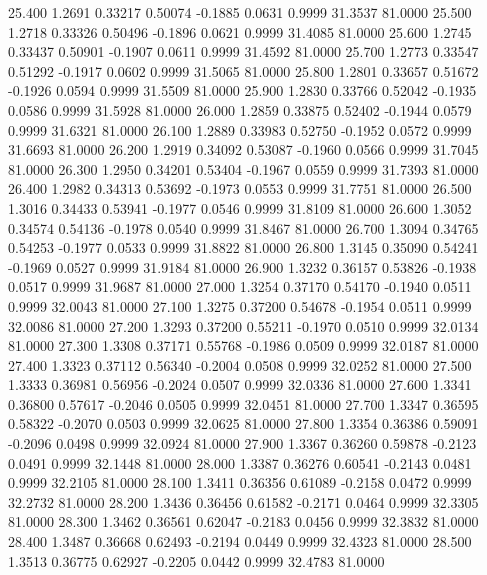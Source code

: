   25.400   1.2691   0.33217   0.50074  -0.1885   0.0631   0.9999  31.3537  81.0000
  25.500   1.2718   0.33326   0.50496  -0.1896   0.0621   0.9999  31.4085  81.0000
  25.600   1.2745   0.33437   0.50901  -0.1907   0.0611   0.9999  31.4592  81.0000
  25.700   1.2773   0.33547   0.51292  -0.1917   0.0602   0.9999  31.5065  81.0000
  25.800   1.2801   0.33657   0.51672  -0.1926   0.0594   0.9999  31.5509  81.0000
  25.900   1.2830   0.33766   0.52042  -0.1935   0.0586   0.9999  31.5928  81.0000
  26.000   1.2859   0.33875   0.52402  -0.1944   0.0579   0.9999  31.6321  81.0000
  26.100   1.2889   0.33983   0.52750  -0.1952   0.0572   0.9999  31.6693  81.0000
  26.200   1.2919   0.34092   0.53087  -0.1960   0.0566   0.9999  31.7045  81.0000
  26.300   1.2950   0.34201   0.53404  -0.1967   0.0559   0.9999  31.7393  81.0000
  26.400   1.2982   0.34313   0.53692  -0.1973   0.0553   0.9999  31.7751  81.0000
  26.500   1.3016   0.34433   0.53941  -0.1977   0.0546   0.9999  31.8109  81.0000
  26.600   1.3052   0.34574   0.54136  -0.1978   0.0540   0.9999  31.8467  81.0000
  26.700   1.3094   0.34765   0.54253  -0.1977   0.0533   0.9999  31.8822  81.0000
  26.800   1.3145   0.35090   0.54241  -0.1969   0.0527   0.9999  31.9184  81.0000
  26.900   1.3232   0.36157   0.53826  -0.1938   0.0517   0.9999  31.9687  81.0000
  27.000   1.3254   0.37170   0.54170  -0.1940   0.0511   0.9999  32.0043  81.0000
  27.100   1.3275   0.37200   0.54678  -0.1954   0.0511   0.9999  32.0086  81.0000
  27.200   1.3293   0.37200   0.55211  -0.1970   0.0510   0.9999  32.0134  81.0000
  27.300   1.3308   0.37171   0.55768  -0.1986   0.0509   0.9999  32.0187  81.0000
  27.400   1.3323   0.37112   0.56340  -0.2004   0.0508   0.9999  32.0252  81.0000
  27.500   1.3333   0.36981   0.56956  -0.2024   0.0507   0.9999  32.0336  81.0000
  27.600   1.3341   0.36800   0.57617  -0.2046   0.0505   0.9999  32.0451  81.0000
  27.700   1.3347   0.36595   0.58322  -0.2070   0.0503   0.9999  32.0625  81.0000
  27.800   1.3354   0.36386   0.59091  -0.2096   0.0498   0.9999  32.0924  81.0000
  27.900   1.3367   0.36260   0.59878  -0.2123   0.0491   0.9999  32.1448  81.0000
  28.000   1.3387   0.36276   0.60541  -0.2143   0.0481   0.9999  32.2105  81.0000
  28.100   1.3411   0.36356   0.61089  -0.2158   0.0472   0.9999  32.2732  81.0000
  28.200   1.3436   0.36456   0.61582  -0.2171   0.0464   0.9999  32.3305  81.0000
  28.300   1.3462   0.36561   0.62047  -0.2183   0.0456   0.9999  32.3832  81.0000
  28.400   1.3487   0.36668   0.62493  -0.2194   0.0449   0.9999  32.4323  81.0000
  28.500   1.3513   0.36775   0.62927  -0.2205   0.0442   0.9999  32.4783  81.0000
